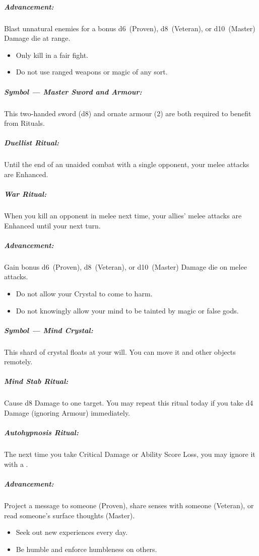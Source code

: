 \documentclass[itdr/core]{subfiles}
\begin{document}
\subparagraph{Advancement:} Blast unnatural enemies for a bonus d6~(Proven), d8~(Veteran), or d10~(Master) Damage die at range.

\creedskip

{\em\begin{itemize}
		\item Only kill in a fair fight.
		\item Do not use ranged weapons or magic of any sort.
\end{itemize}}

\subparagraph{Symbol --- Master Sword and Armour:} This two-handed sword (d8) and ornate armour (2) are both required to benefit from Rituals.

\subparagraph{Duellist Ritual:} Until the end of an unaided combat with a single opponent, your melee attacks are Enhanced.

\subparagraph{War Ritual:} When you kill an opponent in melee next time, your allies' melee attacks are Enhanced until your next turn.

\subparagraph{Advancement:} Gain bonus d6~(Proven), d8~(Veteran), or d10~(Master) Damage die on melee attacks.

\creedskip

{\em\begin{itemize}
		\item Do not allow your Crystal to come to harm.
		\item Do not knowingly allow your mind to be tainted by magic or false gods.
\end{itemize}}

\subparagraph{Symbol --- Mind Crystal:} This shard of crystal floats at your will. You can move it and other objects remotely.

\subparagraph{Mind Stab Ritual:} Cause d8 Damage to one target. You may repeat this ritual today if you take d4 Damage (ignoring Armour) immediately.

\subparagraph{Autohypnosis Ritual:} The next time you take Critical Damage or Ability Score Loss, you may ignore it with a .

\subparagraph{Advancement:} Project a message to someone (Proven), share senses with someone (Veteran), or read someone's surface thoughts (Master).

\break

{\em\begin{itemize}
		\item Seek out new experiences every day.
		\item Be humble and enforce humbleness on others.
\end{itemize}}
\end{document}
